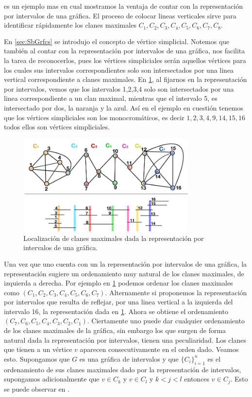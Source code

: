  es un ejemplo mas en cual mostramos la ventaja de contar
con la representación por intervalos de una gráfica. El proceso de colocar
lineas verticales sirve para identificar rápidamente los clanes maximales
$C_1,C_2, C_3, C_4, C_5, C_6, C_7, C_8$.

En \cref{sec:SbGrfcs} se introdujo el concepto de vértice simplicial. Notemos
que también al contar con la representación por intervalos de una gráfica, nos
facilita la tarea de reconocerlos, pues los vértices simpliciales serán aquellos
vértices para los cuales sus intervalos  correspondientes solo son intersectados
por una linea vertical correspondiente a clanes maximales. En
\cref{fig:MaxClqs02}, al fijarnos en la representación por intervalos, vemos que
los intervalos 1,2,3,4 solo son intersectados por una linea correspondiente a un
clan maximal, mientras que el intervalo 5, es intersectado por dos, la naranja y
la azul. Así en el ejemplo en cuestión tenemos que los vértices simpliciales son
los monocrom\'aticos, es decir $1,2,3,4,9,14,15,16$ todos ellos son vértices
simpliciales.

\begin{figure}[H]
  \centering
  \includegraphics[width=0.8\textwidth]{recursos/capturas/209.jpg}
  \caption{Localización de clanes maximales dada la representación por intervalos de una gráfica.}
  \label{fig:MaxClqs02}
\end{figure}

Una vez que uno cuenta con un la representación por intervalos de una gráfica,
la representación sugiere un ordenamiento muy natural de los clanes maximales,
de izquierda a derecha. Por ejemplo en \cref{fig:MaxClqs02} podemos ordenar los
clanes maximales como $(C_1,C_2, C_3, C_4, C_5, C_6, C_7)$. Alternamente si
proponemos la representación por intervalos que resulta de reflejar, por una
linea vertical a la izquierda del intervalo 16, la representación dada en
\cref{fig:MaxClqs02}. Ahora se obtiene el ordenamiento
$(C_7,C_6,C_5,C_4,C_3,C_2,C_1)$. Ciertamente uno puede dar cualquier
ordenamiento de los clanes maximales de la gráfica, sin embargo los que surgen
de forma natural dada la representación por intervalos, tienen una peculiaridad.
Los clanes que tienen a un vértice $v$ aparecen consecutivamente en el orden
dado. Veamos esto. Supongamos que $G$ es una gráfica de intervalos y que
$\{C_i\}_{i=1} ^n$ es el ordenamiento de sus clanes maximales dado por la
representación de intervalos, supongamos adicionalmente que $v\in C_k$ y $v\in
C_l$ y $k<j<l$ entonces $v\in C_j$. Esto se puede observar en
. 



